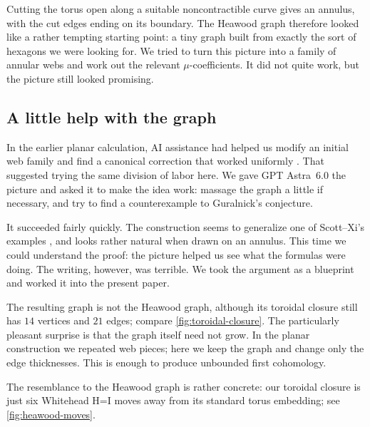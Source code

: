 \documentclass[a4paper,11pt]{amsart}
\numberwithin{equation}{subsection}
\theoremstyle{plain}
\theoremstyle{definition}
\theoremstyle{remark}
\begin{document}
Cutting the torus open along a suitable noncontractible curve
gives an annulus, with the cut edges ending on its boundary.
The Heawood graph therefore looked like a rather tempting
starting point: a tiny graph built from exactly the sort
of hexagons we were looking for.
We tried to turn this picture into a family of annular webs
and work out the relevant $\mu$-coefficients.
It did not quite work, but the picture still looked promising.

\subsection{A little help with the graph}

In the earlier planar calculation, AI assistance had helped
us modify an initial web family and find a canonical
correction that worked uniformly \cite[Section~9]{Finite}.
That suggested trying the same division of labor here.
We gave GPT Astra~6.0 the picture and asked it to make the
idea work: massage the graph a little if necessary, and
try to find a counterexample to Guralnick's conjecture.

It succeeded fairly quickly. The construction seems to
generalize one of Scott--Xi's examples \cite{SX}, and looks
rather natural when drawn on an annulus.
This time we could understand the proof: the picture helped
us see what the formulas were doing.
The writing, however, was terrible.
We took the argument as a blueprint and worked it into
the present paper.

The resulting graph is not the Heawood graph, although its
toroidal closure still has $14$ vertices and $21$ edges;
compare \autoref{fig:toroidal-closure}.
The particularly pleasant surprise is that the graph itself
need not grow. In the planar construction we repeated web
pieces; here we keep the graph and change only the edge
thicknesses. This is enough to produce unbounded first
cohomology.

\begin{remark}
The resemblance to the Heawood graph is rather concrete:
our toroidal closure is just six Whitehead H=I moves away from its
standard torus embedding; see \autoref{fig:heawood-moves}.
\end{remark}
\end{document}

